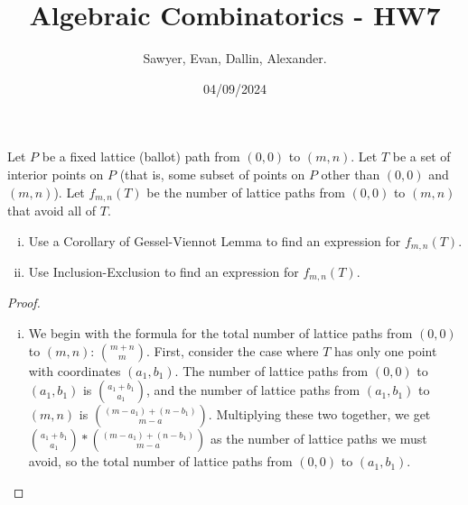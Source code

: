 \documentclass[letterpaper]{article}
\title{Algebraic Combinatorics - HW7}
\author{Sawyer, Evan, Dallin, Alexander.}
\date{04/09/2024}
\begin{document}
\maketitle
\begin{quest}[\textcolor{red}{Lattice Paths avoiding a certain set of points}]
Let $P$ be a fixed lattice (ballot) path from $(0,0)$ to $(m,n)$. Let $T$ be a set of interior points on $P$ (that is, some subset of points on $P$ other than $(0,0)$ and $(m,n)$). Let $f_{m,n}(T)$ be the number of lattice paths from $(0,0)$ to $(m,n)$ that avoid all of $T$.
\begin{enumerate}[(i)]
    \item Use a Corollary of Gessel-Viennot Lemma to find an expression for $f_{m,n}(T)$.
    \item Use Inclusion-Exclusion to find an expression for $f_{m,n}(T)$.
\end{enumerate}
\end{quest}
\begin{proof}
\begin{enumerate}[(i)]
    \item We begin with the formula for the total number of lattice paths from $(0,0)$ to $(m,n)$: ${ m+n \choose m}$. First, consider the case where $T$ has only one point with coordinates $(a_1, b_1)$. The number of lattice paths from $(0,0)$ to $(a_1, b_1)$ is ${a_1+b_1 \choose a_1}$, and the number of lattice paths from $(a_1, b_1)$ to $(m,n)$ is ${(m-a_1)+(n-b_1) \choose m-a}$. Multiplying these two together, we get ${a_1+b_1 \choose a_1}*{(m-a_1)+(n-b_1) \choose m-a}$ as the number of lattice paths we must avoid, so the total number of lattice paths from $(0,0)$ to $(a_1, b_1)$.
\end{enumerate}
\end{proof}
\end{document}
